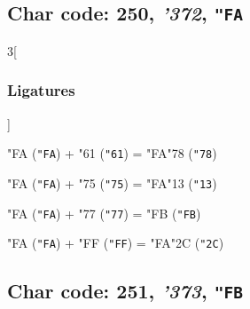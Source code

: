 \documentclass{article}
\newlength{\maxcharwidth}
\begin{document}
\subsection{Char code: 250, {\it'372}, {\tt"FA}}
\label{char_250}


\begin{multicols}{3}[\subsubsection{Ligatures}]

{\testfont\char"FA\noboundary} ({\tt"FA}) + {\testfont\char"61\noboundary} ({\tt"61}) = {\testfont\char"FA\noboundary}{\testfont\char"78\noboundary} ({\tt"78}) 

{\testfont\char"FA\noboundary} ({\tt"FA}) + {\testfont\char"75\noboundary} ({\tt"75}) = {\testfont\char"FA\noboundary}{\testfont\char"13\noboundary} ({\tt"13}) 

{\testfont\char"FA\noboundary} ({\tt"FA}) + {\testfont\char"77\noboundary} ({\tt"77}) = {\testfont\char"FB\noboundary} ({\tt"FB}) 

{\testfont\char"FA\noboundary} ({\tt"FA}) + {\testfont\char"FF\noboundary} ({\tt"FF}) = {\testfont\char"FA\noboundary}{\testfont\char"2C\noboundary} ({\tt"2C}) 

\end{multicols}

\subsection{Char code: 251, {\it'373}, {\tt"FB}}
\label{char_251}

\end{document}
